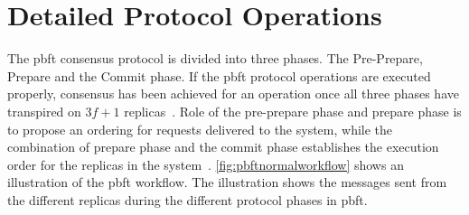 

\iffalse
\section{Detailed Protocol Operations}
\label{sec:detailedProtocol}
The \ac{pbft} consensus protocol is divided into three phases. The Pre-Prepare, Prepare and the Commit phase. If the \ac{pbft} protocol operations are executed properly, consensus has been achieved for an operation once all three phases have transpired on $3f+1$ replicas~\cite[p.~257-259]{BOOK:BuildDepDistSyst}. Role of the pre-prepare phase and prepare phase is to propose an ordering for requests delivered to the system, while the combination of prepare phase and the commit phase establishes the execution order for the replicas in the system~\cite[p.~4]{PAPER:OGPBFT}. \autoref{fig:pbftnormalworkflow} shows an illustration of the \ac{pbft} workflow. The illustration shows the messages sent from the different replicas during the different protocol phases in \ac{pbft}.

